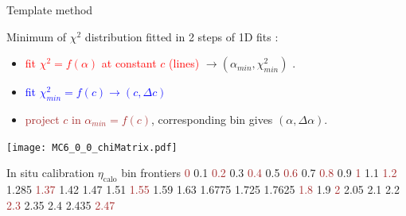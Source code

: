 \begin{frame}{Template method}
  \begin{minipage}{0.59\linewidth}
    Minimum of $\chi^2$ distribution fitted in 2 steps of 1D fits : 
    \begin{itemize}
    \item \textcolor{red}{fit $\chi^2=f(\alpha)$ at constant $c$ (lines)} $\rightarrow (\alpha_{min}, \chi^2_{min})$ .
    \item \textcolor{blue}{fit $\chi^2_{min}=f(c)\rightarrow (c, \Delta c)$}
    \item \textcolor{brown}{project $c$ in $\alpha_{min}=f(c)$}, corresponding bin gives $(\alpha, \Delta\alpha)$.
    \end{itemize}
  \end{minipage}
\hfill
\begin{minipage}{0.4\linewidth}
  \texttt{[image: MC6\_0\_0\_chiMatrix.pdf]}\\
\end{minipage}


\end{frame}

\begin{frame}{In situ calibration $\eta_\text{calo}$ bin frontiers}
        {\tiny \textcolor{brown}{0} 0.1 \textcolor{brown}{0.2} 0.3 \textcolor{brown}{0.4} 0.5 \textcolor{brown}{0.6} 0.7 \textcolor{brown}{0.8} 0.9 \textcolor{brown}{1} 1.1 \textcolor{brown}{1.2} 1.285 \textcolor{brown}{1.37} 1.42 1.47 1.51 \textcolor{brown}{1.55} 1.59 1.63 1.6775 1.725 1.7625 \textcolor{brown}{1.8} 1.9 \textcolor{brown}{2} 2.05 2.1 2.2 \textcolor{brown}{2.3} 2.35 2.4 2.435 \textcolor{brown}{2.47}}
\end{frame}

